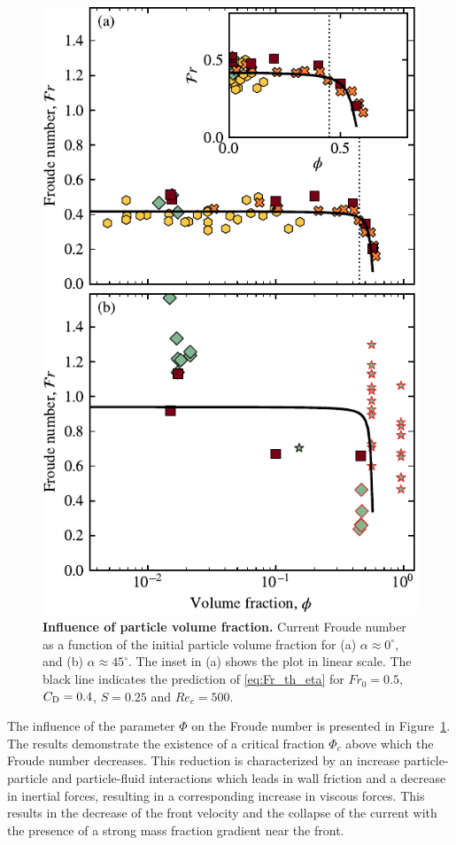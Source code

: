 \documentclass[twocolumn]{article}
\newcommand*{\jean}{\textcolor{jeanc}}
\begin{document}
\begin{figure}
	\centering
	\includegraphics{figure6.pdf}
	\caption{\textbf{Influence of particle volume fraction.} Current Froude number as a function of the initial particle volume fraction for (a) $\alpha \approx 0^\circ$, and (b) $\alpha \approx 45^\circ$. The inset in (a) shows the plot in linear scale. The black line indicates the prediction of \eqref{eq:Fr_th_eta} for $Fr_{0} = 0.5$, $C_{\rm D} = 0.4$, $S = 0.25$ and $Re_c = 500$.}
	\label{fig:fig6}
\end{figure}


\jean{The influence of the parameter $\Phi$ on the Froude number is presented in Figure~\ref{fig:fig6}. The results demonstrate the existence of a critical fraction $\Phi_{c}$ above which the Froude number decreases. This reduction is characterized by an increase particle-particle and particle-fluid interactions which leads in wall friction and a decrease in inertial forces, resulting in a corresponding increase in viscous forces. This results in the decrease of the front velocity and the collapse of the current with the presence of a strong mass fraction gradient near the front.}
\end{document}
